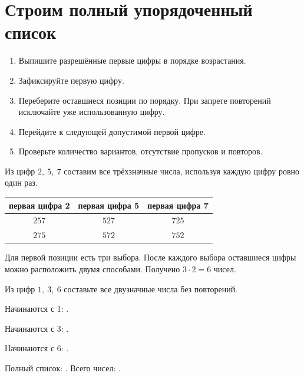 \newpage
\section{Строим полный упорядоченный список}

\begin{reflectionbox}
  \begin{enumerate}[label=\textbf{\arabic*.}]
    \item Выпишите разрешённые первые цифры в порядке возрастания.
    \item Зафиксируйте первую цифру.
    \item Переберите оставшиеся позиции по порядку. При запрете повторений
      исключайте уже использованную цифру.
    \item Перейдите к следующей допустимой первой цифре.
    \item Проверьте количество вариантов, отсутствие пропусков и повторов.
  \end{enumerate}
\end{reflectionbox}

\begin{problembox}
  Из цифр \(2,\ 5,\ 7\) составим все трёхзначные числа, используя каждую цифру
  ровно один раз.
  \begin{center}
  \renewcommand{\arraystretch}{1.5}
  \begin{tabular}{c|c|c}
    \toprule
    первая цифра 2 & первая цифра 5 & первая цифра 7 \\
    \midrule
    \(257\) & \(527\) & \(725\) \\
    \(275\) & \(572\) & \(752\) \\
    \bottomrule
  \end{tabular}
  \end{center}
  Для первой позиции есть три выбора. После каждого выбора оставшиеся цифры
  можно расположить двумя способами. Получено \(3\cdot2=6\) чисел.
\end{problembox}

\begin{practicebox}
  Из цифр \(1,\ 3,\ 6\) составьте все двузначные числа без повторений.

  Начинаются с 1: \answerblank[38mm].

  Начинаются с 3: \answerblank[38mm].

  Начинаются с 6: \answerblank[38mm].

  Полный список: \answerblank[86mm]. Всего чисел: \answerblank[14mm].
\end{practicebox}

